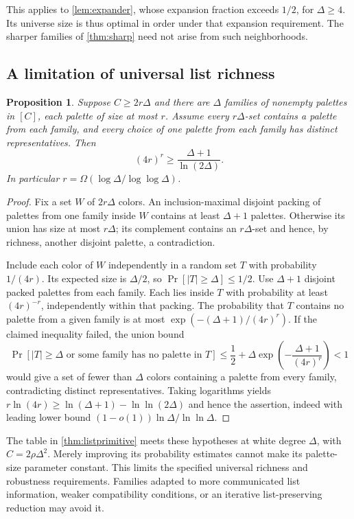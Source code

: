 \documentclass[11pt]{article}
\newtheorem{proposition}[theorem]{Proposition}
\theoremstyle{definition}
\theoremstyle{remark}
\newcommand{\abs}[1]{\left|#1\right|}
\begin{document}
This applies to \cref{lem:expander}, whose expansion fraction exceeds
$1/2$, for $\Delta\ge4$. Its universe size is thus optimal in order
under that expansion requirement. The sharper families of
\cref{thm:sharp} need not arise from such neighborhoods.

\subsection{A limitation of universal list richness}
\begin{proposition}\label{prop:richnessbarrier}
Suppose $C\ge2r\Delta$ and there are $\Delta$ families of nonempty
palettes in $[C]$, each palette of size at most $r$. Assume every
$r\Delta$-set contains a palette from each family, and every choice
of one palette from each family has distinct representatives. Then
\[
 (4r)^r\ge\frac{\Delta+1}{\ln(2\Delta)}.
\]
In particular $r=\Omega(\log\Delta/\log\log\Delta)$.
\end{proposition}
\begin{proof}
Fix a set $W$ of $2r\Delta$ colors. An inclusion-maximal disjoint
packing of palettes from one family inside $W$ contains at least
$\Delta+1$ palettes. Otherwise its union has size at most $r\Delta$;
its complement contains an $r\Delta$-set and hence, by richness,
another disjoint palette, a contradiction.

Include each color of $W$ independently in a random set $T$ with
probability $1/(4r)$. Its expected size is $\Delta/2$, so
$\Pr[\abs T\ge\Delta]\le1/2$. Use $\Delta+1$ disjoint packed palettes
from each family. Each lies inside $T$ with probability at least
$(4r)^{-r}$, independently within that packing. The probability that
$T$ contains no palette from a given family is at most
$\exp(- (\Delta+1)/(4r)^r)$.
If the claimed inequality failed, the union bound
\[
 \Pr[\abs T\ge\Delta\text{ or some family has no palette in }T]
 \le\frac12+\Delta\exp\left(-\frac{\Delta+1}{(4r)^r}\right)<1
\]
would give a set of fewer than $\Delta$ colors containing a palette
from every family, contradicting distinct representatives.
Taking logarithms yields
$r\ln(4r)\ge\ln(\Delta+1)-\ln\ln(2\Delta)$ and hence the assertion,
indeed with leading lower bound $(1-o(1))\ln\Delta/\ln\ln\Delta$.
\end{proof}

The table in \cref{thm:listprimitive} meets these hypotheses at white
degree $\Delta$, with $C=2\rho\Delta^2$. Merely improving its probability
estimates cannot make its palette-size parameter constant. This limits
the specified universal richness and robustness requirements. Families
adapted to more communicated list information, weaker compatibility
conditions, or an iterative list-preserving reduction may avoid it.
\end{document}
